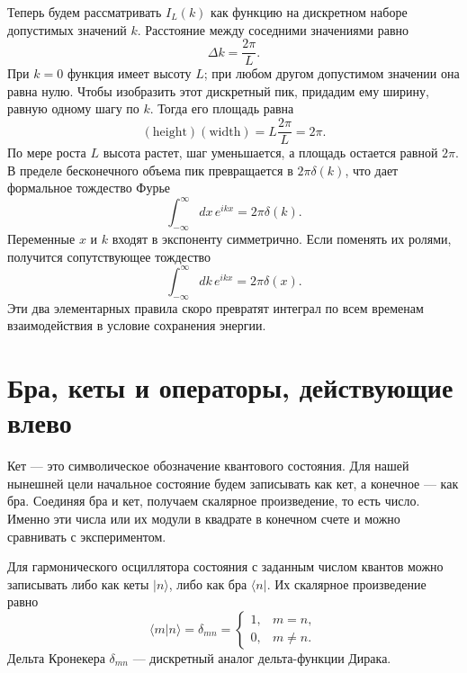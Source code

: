 Теперь будем рассматривать \(I_L(k)\) как функцию на дискретном наборе допустимых значений \(k\). Расстояние между соседними значениями равно
\begin{equation}
\Delta k=\frac{2\pi}{L}.
\end{equation}
При \(k=0\) функция имеет высоту \(L\); при любом другом допустимом значении она равна нулю. Чтобы изобразить этот дискретный пик, придадим ему ширину, равную одному шагу по \(k\). Тогда его площадь равна
\begin{equation}
(\text{height})(\text{width})
=L\frac{2\pi}{L}=2\pi.
\end{equation}
По мере роста \(L\) высота растет, шаг уменьшается, а площадь остается равной \(2\pi\). В пределе бесконечного объема пик превращается в \(2\pi\delta(k)\), что дает формальное тождество Фурье
\begin{equation}
\int_{-\infty}^{\infty}dx\,e^{ikx}=2\pi\delta(k).
\end{equation}
Переменные \(x\) и \(k\) входят в экспоненту симметрично. Если поменять их ролями, получится сопутствующее тождество
\begin{equation}
\int_{-\infty}^{\infty}dk\,e^{ikx}=2\pi\delta(x).
\end{equation}
Эти два элементарных правила скоро превратят интеграл по всем временам взаимодействия в условие сохранения энергии.

\section{Бра, кеты и операторы, действующие влево}

Кет — это символическое обозначение квантового состояния. Для нашей нынешней цели начальное состояние будем записывать как кет, а конечное — как бра. Соединяя бра и кет, получаем скалярное произведение, то есть число. Именно эти числа или их модули в квадрате в конечном счете и можно сравнивать с экспериментом.

\begin{classroomqa}
\end{classroomqa}

Для гармонического осциллятора состояния с заданным числом квантов можно записывать либо как кеты \(\lvert n\rangle\), либо как бра \(\langle n\rvert\). Их скалярное произведение равно
\begin{equation}
\langle m\vert n\rangle=\delta_{mn}
=\begin{cases}
1,&m=n,\\
0,&m\neq n.
\end{cases}
\end{equation}
Дельта Кронекера \(\delta_{mn}\) — дискретный аналог дельта-функции Дирака.

